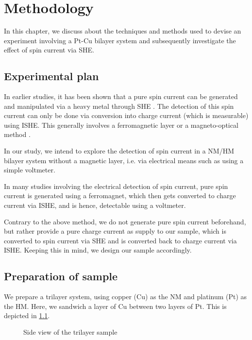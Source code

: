 \chapter{Methodology}

\label{chapter4}

In this chapter, we discuss about the techniques and methods used to devise an experiment involving a Pt-Cu bilayer system and subsequently investigate the effect of spin current via SHE.

\section{Experimental plan} \label{sec:plan}

In earlier studies, it has been shown that a pure spin current can be generated and manipulated via a heavy metal through SHE \cite{hirsch1999spin,sinova2004universal,zhang2000spin}. The detection of this spin current can only be done via conversion into charge current (which is measurable) using ISHE. This generally involves a ferromagnetic layer or a magneto-optical method \cite{kimura2007room,li2019spin,stamm2017magneto}.

In our study, we intend to explore the detection of spin current in a NM/HM bilayer system without a magnetic layer, i.e. via electrical means such as using a simple voltmeter.

In many studies involving the electrical detection of spin current, pure spin current is generated using a ferromagnet, which then gets converted to charge current via ISHE, and is hence, detectable using a voltmeter.

Contrary to the above method, we do not generate pure spin current beforehand, but rather provide a pure charge current as supply to our sample, which is converted to spin current via SHE and is converted back to charge current via ISHE. Keeping this in mind, we design our sample accordingly.

\section{Preparation of sample}

We prepare a trilayer system, using copper (Cu) as the NM and platinum (Pt) as the HM. Here, we sandwich a layer of Cu between two layers of Pt. This is depicted in \cref{layers}.

\begin{figure}
    \centering
{}
    \caption{Side view of the trilayer sample}
    \label{layers}
\end{figure}

